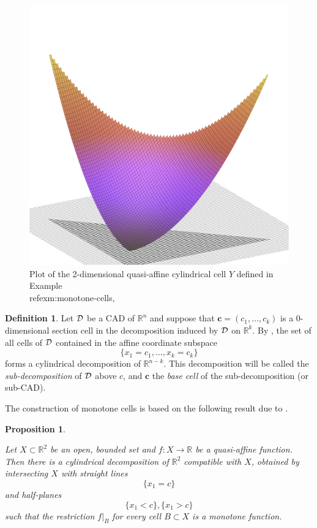 \documentclass[
]{book}
\newtheorem{proposition}{Proposition}[chapter]
\theoremstyle{definition}
\newtheorem{definition}{Definition}[chapter]
\theoremstyle{definition}
\theoremstyle{definition}
\theoremstyle{definition}
\theoremstyle{remark}
\begin{document}
\begin{figure}

{\centering \includegraphics[width=0.6\linewidth]{gnuplot/qanm-surf} 

}

\caption{Plot of the 2-dimensional quasi-affine cylindrical cell $Y$ defined in Example \\ref{exm:monotone-cells},}\label{fig:unnamed-chunk-2}
\end{figure}

\begin{definition}
\protect\hypertarget{def:sub-cad}{}\label{def:sub-cad}Let \(\cal D\) be a CAD of \(\mathbb{R}^n\) and suppose that \(\mathbf{c} = (c_1,\ldots,c_k)\) is a \(0\)-dimensional section cell in the decomposition induced by \(\cal D\) on \(\mathbb{R}^k\).
By \citep[ Remark 3.8]{bgv15}, the set of all cells of \(\cal D\) contained in the affine coordinate subspace
\[
\{ x_1=c_1,\dots,x_k=c_k \}
\]
forms a cylindrical decomposition of \(\mathbb{R}^{n-k}\). This decomposition will be called the \emph{sub-decomposition} of \(\cal D\) above \(c\), and \(\mathbf{c}\) the \emph{base cell} of the sub-decomposition (or sub-CAD).
\end{definition}

The construction of monotone cells is based on the following result due to \citet{bgv15}.

\begin{proposition}
\protect\hypertarget{prp:bgv-monotone}{}\label{prp:bgv-monotone}\citep[Lemma 3.18]{bgv15}

Let \(X \subset \mathbb{R}^2\) be an open, bounded set and \(f : X \to \mathbb{R}\) be a quasi-affine function.
Then there is a cylindrical decomposition of \(\mathbb{R}^2\) compatible with \(X\), obtained by intersecting \(X\) with straight lines \[\{x_1 = c\}\] and half-planes \[\{x_1 < c\},\{x_1 > c\}\] such that the restriction \(f\vert_B\) for every cell \(B \subset X\) is a monotone function.
\end{proposition}
\end{document}
